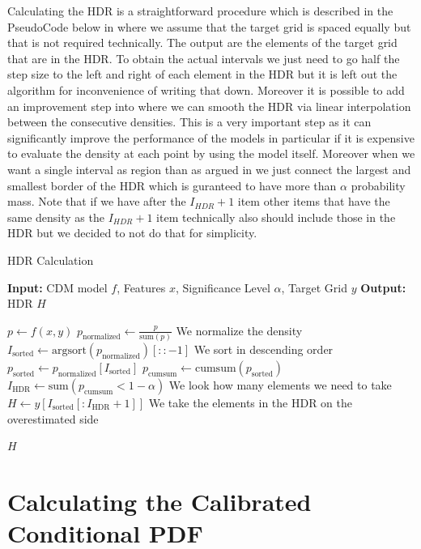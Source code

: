 Calculating the HDR is a straightforward procedure which is described in the PseudoCode below in  where we assume that the target grid is spaced equally but that is not required technically. The output are the elements of the target grid that are in the HDR. To obtain the actual intervals we just need to go half the step size to the left and right of each element in the HDR but it is left out the algorithm for inconvenience of writing that down. Moreover it is possible to add an improvement step into  where we can smooth the HDR via linear interpolation between the consecutive densities. This is a very important step as it can significantly improve the performance of the models in particular if it is expensive to evaluate the density at each point by using the model itself. Moreover when we want a single interval as region than as argued in  we just connect the largest and smallest border of the HDR which is guranteed to have more than $\alpha$ probability mass. Note that if we have after the $I_{HDR} + 1$ item other items that have the same density as the $I_{HDR} + 1$ item technically also should include those in the HDR but we decided to not do that for simplicity.

\begin{algorithm}
    \caption{HDR Calculation}
    \label{alg:hdr}
    \begin{algorithmic}
        \STATE \textbf{Input:} CDM model $f$, Features $x$, Significance Level $\alpha$, Target Grid $y$
        \STATE \textbf{Output:} HDR $H$

        \STATE $p \leftarrow f(x, y)$
        \STATE $p_{\text{normalized}} \leftarrow \frac{p}{\text{sum}(p)}$ We normalize the density
        \STATE $I_{\text{sorted}} \leftarrow \text{argsort}(p_{\text{normalized}})[::-1]$ We sort in descending order
        \STATE $p_{\text{sorted}} \leftarrow p_{\text{normalized}}[I_{\text{sorted}}]$
        \STATE $p_{\text{cumsum}} \leftarrow \text{cumsum}(p_{\text{sorted}})$
        \STATE $I_{\text{HDR}} \leftarrow \text{sum}(p_{\text{cumsum}} < 1 - \alpha)$ We look how many elements we need to take
        \STATE $H \leftarrow y[I_{\text{sorted}}[:I_{\text{HDR}} + 1]]$ We take the elements in the HDR on the overestimated side

        \RETURN $H$
    \end{algorithmic}
\end{algorithm}

\section{Calculating the Calibrated Conditional PDF}

